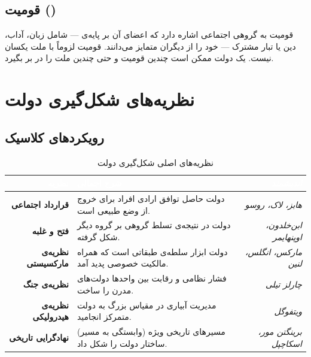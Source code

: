 \subsection{قومیت ()}

قومیت به گروهی اجتماعی اشاره دارد که اعضای آن بر پایه‌ی  — شامل زبان، آداب، دین یا تبار مشترک — خود را از دیگران متمایز می‌دانند. قومیت لزوماً با ملت یکسان نیست. یک دولت ممکن است چندین قومیت و حتی چندین ملت را در بر بگیرد.

\simplesep

\section{نظریه‌های شکل‌گیری دولت}

\subsection{رویکردهای کلاسیک}

\begin{table}[htbp]
\centering
\caption{نظریه‌های اصلی شکل‌گیری دولت}
\label{tab:state-formation-theories}
\begin{tabularx}{\textwidth}{>{\bfseries\color{PrimaryDark}}r X >{\small\itshape\color{TextMid}}r}
\toprule
\rowcolor{PrimaryDark}
\textcolor{white}{\bfseries نظریه} &
\textcolor{white}{\bfseries شرح اجمالی} &
\textcolor{white}{\bfseries اندیشمند} \\
\midrule
قرارداد اجتماعی &
دولت حاصل توافق ارادی افراد برای خروج از وضع طبیعی است.
& هابز، لاک، روسو \\
فتح و غلبه &
دولت در نتیجه‌ی تسلط گروهی بر گروه دیگر شکل گرفته.
& ابن‌خلدون، اوپنهایمر \\
نظریه‌ی مارکسیستی &
دولت ابزار سلطه‌ی طبقاتی است که همراه مالکیت خصوصی پدید آمد.
& مارکس، انگلس، لنین \\
نظریه‌ی جنگ &
فشار نظامی و رقابت بین واحدها دولت‌های مدرن را ساخت.
& چارلز تیلی \\
نظریه‌ی هیدرولیکی &
مدیریت آبیاری در مقیاس بزرگ به دولت متمرکز انجامید.
& ویتفوگل \\
نهادگرایی تاریخی &
مسیرهای تاریخی ویژه (وابستگی به مسیر) ساختار دولت را شکل داد.
& برینگتن مور، اسکاچپل \\
\bottomrule
\end{tabularx}
\end{table}

